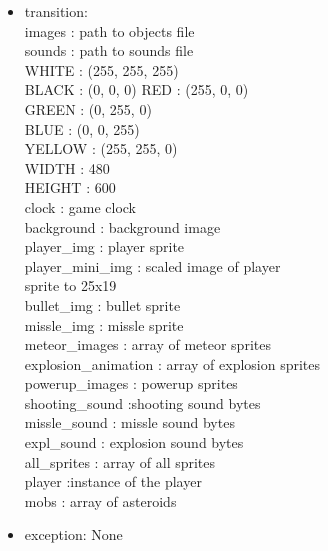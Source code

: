 \documentclass[12pt, titlepage]{article}
\begin{document}
\begin{itemize}
	\item transition:\\
	images : path to objects file\\
	sounds : path to sounds file\\
	WHITE : (255, 255, 255)\\
	BLACK : (0, 0, 0)
	RED : (255, 0, 0)\\
	GREEN : (0, 255, 0)\\
	BLUE : (0, 0, 255)\\
	YELLOW : (255, 255, 0)\\
	WIDTH : 480\\
	HEIGHT : 600\\
	clock : game clock \\
	background : background image \\
	player\_img : player sprite \\
	player\_mini\_img : scaled image of player \\ sprite to 25x19 \\
	bullet\_img : bullet sprite \\
	missle\_img : missle sprite \\
	meteor\_images : array of meteor sprites \\
	explosion\_animation : array of explosion sprites \\
	powerup\_images : powerup sprites \\
	shooting\_sound :shooting sound bytes \\
	missle\_sound : missle sound bytes \\
	expl\_sound : explosion sound bytes \\
	all\_sprites : array of all sprites \\
	player :instance of the player \\
	mobs : array of asteroids \\
	
	\item exception: None
	
\end{itemize}
\end{document}
